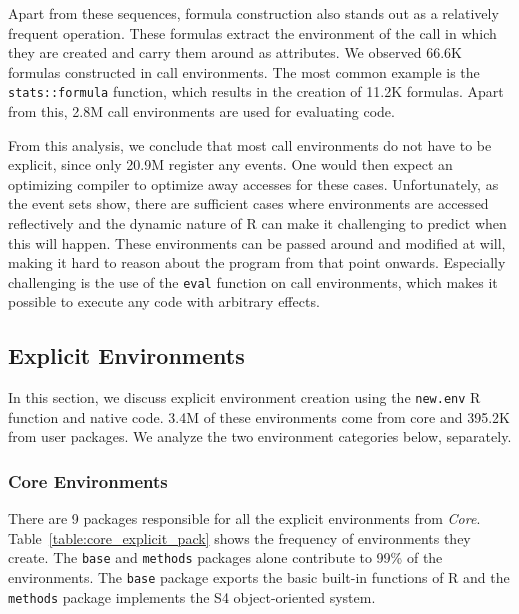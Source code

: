 \documentclass[10pt,review,sigplan,authorversion=true]{acmart}
\newcommand{\code}[1]{\lstinline |#1|\xspace}
\newcommand{\newEnv}{\code{new.env}}
\begin{document}
  Apart from these sequences, formula construction also stands out as a
  relatively frequent operation. These formulas extract the environment of the
  call in which they are created and carry them around as attributes. We
  observed 66.6K formulas constructed in call environments. The most common
  example is the \code{stats::formula} function, which results in the creation
  of 11.2K formulas. Apart from this, 2.8M call environments are used for
  evaluating code.


From this analysis, we conclude that most call environments do not have to be
explicit, since only 20.9M register any events. One would then expect an
optimizing compiler to optimize away accesses for these cases. Unfortunately, as
the event sets show, there are sufficient cases where environments are accessed
reflectively and the dynamic nature of R can make it challenging to predict when
this will happen. These environments can be passed around and modified at will,
making it hard to reason about the program from that point onwards. Especially
challenging is the use of the \code{eval} function on call environments, which
makes it possible to execute any code with arbitrary effects.

\subsection{Explicit Environments}
In this section, we discuss explicit environment creation using the \newEnv R
function and native code. 3.4M of these environments come from core and 395.2K
from user packages. We analyze the two environment categories below, separately.

\subsubsection{Core Environments}

There are 9 packages responsible for all the explicit environments from
\emph{Core}. Table~\ref{table:core_explicit_pack} shows the frequency of
environments they create. The \code{base} and \code{methods} packages alone
contribute to 99\% of the environments. The \code{base} package exports the
basic built-in functions of R and the \code{methods} package implements the S4
object-oriented system.
\end{document}
